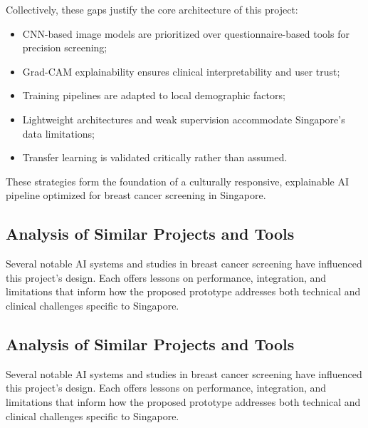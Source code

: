 \documentclass[12pt]{article}
\begin{document}
\vspace{0.5em}
Collectively, these gaps justify the core architecture of this project:
\begin{itemize}
    \item CNN-based image models are prioritized over questionnaire-based tools for precision screening;
    \item Grad-CAM explainability ensures clinical interpretability and user trust;
    \item Training pipelines are adapted to local demographic factors;
    \item Lightweight architectures and weak supervision accommodate Singapore's data limitations;
    \item Transfer learning is validated critically rather than assumed.
\end{itemize}

These strategies form the foundation of a culturally responsive, explainable AI pipeline optimized for breast cancer screening in Singapore.

\subsection{Analysis of Similar Projects and Tools}

Several notable AI systems and studies in breast cancer screening have influenced this project’s design. Each offers lessons on performance, integration, and limitations that inform how the proposed prototype addresses both technical and clinical challenges specific to Singapore.

\subsection{Analysis of Similar Projects and Tools}

Several notable AI systems and studies in breast cancer screening have influenced this project’s design. Each offers lessons on performance, integration, and limitations that inform how the proposed prototype addresses both technical and clinical challenges specific to Singapore.
\end{document}
